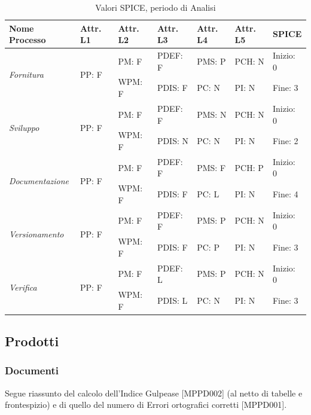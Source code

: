 \documentclass[openany,12pt,a4paper]{report}
\begin{document}
\begin{table}
	\begin{center}
		\setlength\LTleft{-22mm}
		\begin{longtable}{|p{35mm}|p{20mm}|p{20mm}|p{20mm}|p{20mm}|p{20mm}|p{20mm}|}
			\hline
			\textbf{Nome Processo} & \textbf{Attr. L1} & \textbf{Attr. L2} & \textbf{Attr. L3} & \textbf{Attr. L4} & \textbf{Attr. L5} & \textbf{SPICE}\\
			\hline
			\multirow{2}{*}{\textit{Fornitura}} & \multirow{2}{*}{PP: F} & PM: F & PDEF: F & PMS: P & PCH: N & Inizio: 0\\  
			\cline{3-7}
			&          & WPM: F & PDIS: F & PC: N & PI: N & Fine: 3 \\ 
			\hline
			\multirow{2}{*}{\textit{Sviluppo}} & \multirow{2}{*}{PP: F} & PM: F & PDEF: F & PMS: N & PCH: N & Inizio: 0\\  \cline{3-7}
			&          & WPM: F & PDIS: N & PC: N & PI: N & Fine: 2\\
			\hline\multirow{2}{*}{\textit{Documentazione}} & \multirow{2}{*}{PP: F} & PM: F & PDEF: F & PMS: F & PCH: P & Inizio: 0\\  \cline{3-7}
			&          & WPM: F & PDIS: F & PC: L & PI: N & Fine: 4\\ 
			\hline\multirow{2}{*}{\textit{Versionamento}} & \multirow{2}{*}{PP: F} & PM: F & PDEF: F & PMS: P & PCH: N & Inizio: 0\\  \cline{3-7}
			&          & WPM: F & PDIS: F & PC: P & PI: N & Fine: 3\\ 
			\hline\multirow{2}{*}{\textit{Verifica}} & \multirow{2}{*}{PP: F} & PM: F & PDEF: L & PMS: P & PCH: N & Inizio: 0\\  \cline{3-7}
			&          & WPM: F & PDIS: L & PC: N & PI: N & Fine: 3\\ 
			\hline       
		\end{longtable}
	\end{center}
	\caption{Valori SPICE, periodo di Analisi} 
\end{table}

\subsection{Prodotti}

\subsubsection{Documenti}

Segue riassunto del calcolo dell'Indice Gulpease [MPPD002] (al netto di tabelle e frontespizio) e di quello del numero di Errori ortografici corretti [MPPD001].
\end{document}
